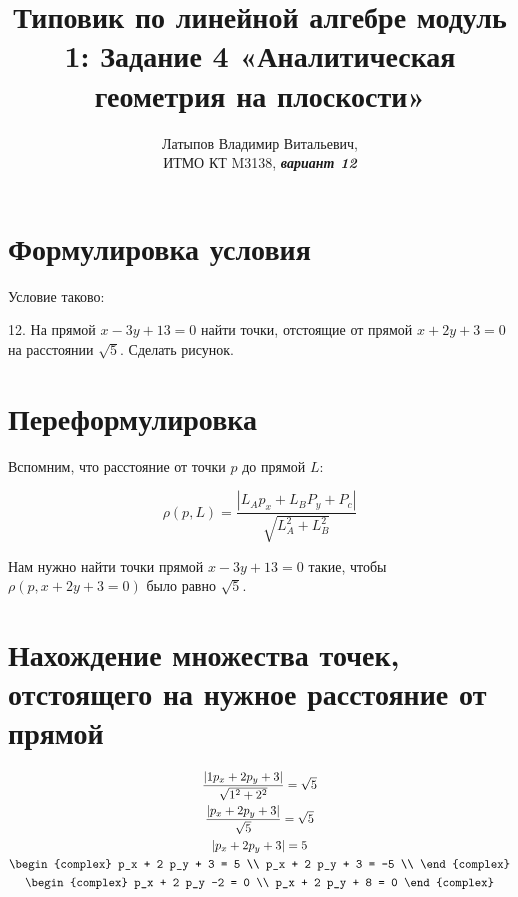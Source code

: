\documentclass[12pt, a4paper]{article}
\author{Латыпов Владимир Витальевич, \\ ИТМО КТ M3138, \Huge{\textit{\textbf{вариант 12}}}}
\title{Типовик по линейной алгебре модуль 1: Задание 4 «Аналитическая геометрия на плоскости»}
\begin{document}
    \tittoc

    \section{Формулировка условия}

    \begin{statement}
        Условие таково: 
        
        12. На прямой $x − 3y + 13 = 0$ найти точки, отстоящие от прямой $x + 2y + 3 = 0$ на расстоянии $\sqrt{5}$. Сделать рисунок.
    \end{statement}

    \section{Переформулировка}

    Вспомним, что расстояние от точки $p$ до прямой $L$:

    \begin{equation}
        \rho(p, L) = \frac {|L_A p_x + L_B P_y + P_c|}{\sqrt {L_A^{2}+L_B^{2}}}
    \end{equation}
    
    Нам нужно найти точки прямой $x − 3y + 13 = 0$ такие, 
    чтобы $\rho(p, x + 2y + 3 = 0)$ было равно $\sqrt{5}$.

    \section{Нахождение множества точек, отстоящего на нужное расстояние от прямой}

    \begin{gather}
        \frac {|1 p_x + 2 p_y + 3|}{\sqrt {1^{2}+2^{2}}} = \sqrt{5} \\
        \frac {|p_x + 2 p_y + 3|}{\sqrt {5}} = \sqrt{5} \\
        |p_x + 2 p_y + 3| = 5 \\
        \begin{complex}
            p_x + 2 p_y + 3 = 5 \\
            p_x + 2 p_y + 3 = -5 \\
        \end{complex} \\
        \begin{complex}
            p_x + 2 p_y -2 = 0 \\
            p_x + 2 p_y + 8 = 0
        \end{complex}
    \end{gather}
\end{document}
